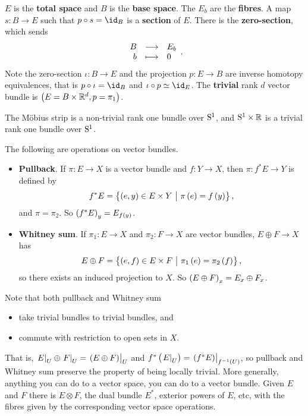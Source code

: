 \begin{notation*}
$ E $ is the \textbf{total space} and $ B $ is the \textbf{base space}. The $ E_b $ are the \textbf{fibres}. A map $ s : B \to E $ such that $ p \circ s = \id_B $ is a \textbf{section} of $ E $. There is the \textbf{zero-section}, which sends
$$ \function{B}{E_b}{b}{0}. $$
Note the zero-section $ \iota : B \to E $ and the projection $ p : E \to B $ are inverse homotopy equivalences, that is $ p \circ \iota = \id_B $ and $ \iota \circ p \simeq \id_E $. The \textbf{trivial} rank $ d $ vector bundle is $ \br{E = B \times \RR^d, p = \pi_1} $.
\end{notation*}

\begin{example*}
The M\"obius strip is a non-trivial rank one bundle over $ \S^1 $, and $ \S^1 \times \RR $ is a trivial rank one bundle over $ \S^1 $.
\end{example*}

The following are operations on vector bundles.
\begin{itemize}
\item \textbf{Pullback}. If $ \pi : E \to X $ is a vector bundle and $ f : Y \to X $, then $ \pi : f^*E \to Y $ is defined by
$$ f^*E = \cbr{\br{e, y} \in E \times Y \st \pi\br{e} = f\br{y}}, $$
and $ \pi = \pi_2 $. So $ \br{f^*E}_y = E_{f\br{y}} $.
\item \textbf{Whitney sum}. If $ \pi_1 : E \to X $ and $ \pi_2 : F \to X $ are vector bundles, $ E \oplus F \to X $ has
$$ E \oplus F = \cbr{\br{e, f} \in E \times F \st \pi_1\br{e} = \pi_2\br{f}}, $$
so there exists an induced projection to $ X $. So $ \br{E \oplus F}_x = E_x \oplus F_x $.
\end{itemize}
Note that both pullback and Whitney sum
\begin{itemize}
\item take trivial bundles to trivial bundles, and
\item commute with restriction to open sets in $ X $.
\end{itemize}
That is, $ \eval{E}_U \oplus \eval{F}_U = \eval{\br{E \oplus F}}_U $ and $ f^*\br{\eval{E}_U} = \eval{\br{f^*E}}_{f^{-1}\br{U}} $, so pullback and Whitney sum preserve the property of being locally trivial. More generally, anything you can do to a vector space, you can do to a vector bundle. Given $ E $ and $ F $ there is $ E \otimes F $, the dual bundle $ E^* $, exterior powers of $ E $, etc, with the fibres given by the corresponding vector space operations.

